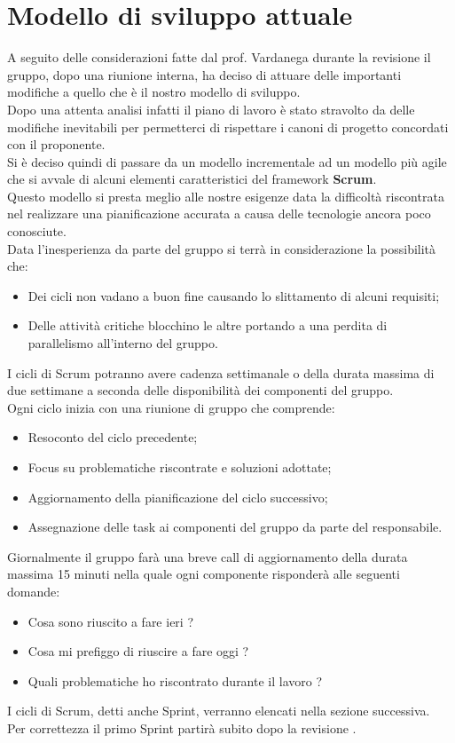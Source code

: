 \section{Modello di sviluppo attuale} \label{section:modello_di_sviluppo_attuale}
A seguito delle considerazioni fatte dal prof. Vardanega durante la revisione \RTB{} il gruppo, dopo una riunione interna, ha deciso di attuare delle importanti modifiche a quello che è il nostro modello di sviluppo.\\
Dopo una attenta analisi infatti il piano di lavoro è stato stravolto da delle modifiche inevitabili per permetterci di rispettare i canoni di progetto concordati con il proponente.\\
Si è deciso quindi di passare da un modello incrementale ad un modello più agile che si avvale di alcuni elementi caratteristici del framework \textbf{Scrum}\glo{}.\\
Questo modello si presta meglio alle nostre esigenze data la difficoltà riscontrata nel realizzare una pianificazione accurata a causa delle tecnologie ancora poco conosciute.\\
Data l'inesperienza da parte del gruppo si terrà in considerazione la possibilità che:
\begin{itemize}
  \item Dei cicli non vadano a buon fine causando lo slittamento di alcuni requisiti;
  \item Delle attività critiche blocchino le altre portando a una perdita di parallelismo all'interno del gruppo.
\end{itemize}
I cicli di Scrum potranno avere cadenza settimanale o della durata massima di due settimane a seconda delle disponibilità dei componenti del gruppo.\\
Ogni ciclo inizia con una riunione di gruppo che comprende:
\begin{itemize}
  \item Resoconto del ciclo precedente;
  \item Focus su problematiche riscontrate e soluzioni adottate;
  \item Aggiornamento della pianificazione del ciclo successivo;
  \item Assegnazione delle task ai componenti del gruppo da parte del responsabile.
\end{itemize}
Giornalmente il gruppo farà una breve call di aggiornamento della durata massima 15 minuti nella quale ogni componente risponderà alle seguenti domande:
\begin{itemize}
  \item Cosa sono riuscito a fare ieri ?
  \item Cosa mi prefiggo di riuscire a fare oggi ?
  \item Quali problematiche ho riscontrato durante il lavoro ?
\end{itemize}
I cicli di Scrum\glo{}, detti anche Sprint\glo{}, verranno elencati nella sezione successiva.\\
Per correttezza il primo Sprint partirà subito dopo la revisione \RTB{}.
\pagebreak

